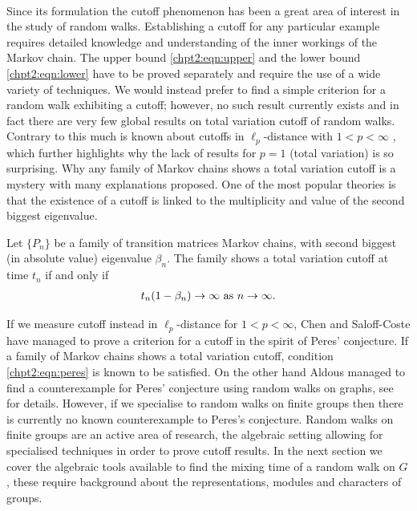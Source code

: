 \documentclass[11pt]{report}
\begin{document}
\paragraph{}
Since its formulation the cutoff phenomenon has been a great area of interest 
in the study of random walks. Establishing a cutoff for any particular example  
requires detailed knowledge and understanding of the inner workings of the Markov chain. The upper bound \eqref{chpt2:eqn:upper} and the lower bound \eqref{chpt2:eqn:lower} 
have to be proved separately and require the use of a wide variety of 
techniques. We would instead prefer to find a simple criterion for a random walk exhibiting a cutoff; however,  no 
such result currently exists and in fact there are very few global results 
on total variation cutoff of random walks. Contrary to this much is known about cutoffs in $\ell_{p}$-distance with $1<p<\infty$ \cite{chen2008cutoff}, which further highlights why the lack of results for $p=1$ (total variation) is so surprising.  Why any family of Markov chains shows a total variation cutoff is a mystery with many explanations proposed. One of the most popular theories is that the existence of a cutoff is linked to the 
multiplicity and value of the second biggest eigenvalue.

\begin{conj}
	Let $\{P_{n}\}$ be a family of transition matrices 
	Markov chains, with 
	second biggest (in absolute value) eigenvalue $\beta_{n}$. The family shows a 
	total variation cutoff at 
	time $t_{n}$ if and only if
	\begin{eqnarray}
	\label{chpt2:eqn:peres}
	t_{n}(1 - \beta_{n})  \rightarrow \infty \textnormal{ as } n 
	\to \infty .
	\end{eqnarray}
\end{conj}
If we measure cutoff instead in $\ell_{p}$-distance for $1<p<\infty$, Chen and Saloff-Coste \cite{chen2008cutoff} have managed to prove a criterion for a cutoff in the spirit of Peres' conjecture. 
If a family of Markov chains shows a total variation cutoff, condition \eqref{chpt2:eqn:peres} is known to be satisfied.  
On the other hand Aldous managed to find a counterexample for Peres' conjecture using random walks on graphs, see \cite[Section 4.2]{chen2006cutoff} for details. However, if we specialise to random walks on finite groups then there is currently no known counterexample to Peres's conjecture. 
Random walks on finite groups are an active area of research, the algebraic setting allowing for specialised techniques in order to prove cutoff results. In the next section we cover the 
algebraic tools available to find the mixing time of a random walk on $G$, these require background about the representations, modules and characters of groups.
\end{document}
